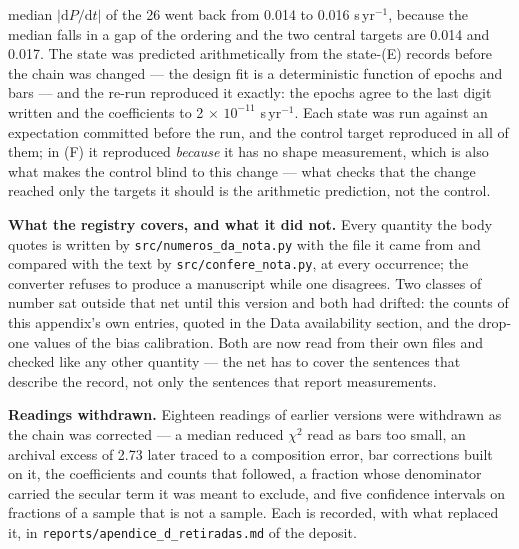 \documentclass{aa}
\begin{document}
median $|\mathrm{d}P/\mathrm{d}t|$ of the 26 went back from 0.014 to 0.016 s\,yr$^{-1}$, because the median falls in a gap of the ordering and the two central targets are 0.014 and 0.017. The state was predicted arithmetically from the state-(E) records before the chain was changed --- the design fit is a deterministic function of epochs and bars --- and the re-run reproduced it exactly: the epochs agree to the last digit written and the coefficients to 2 $\times$ $10^{-11}$ s\,yr$^{-1}$. Each state was run against an expectation committed before the run, and the control target reproduced in all of them; in (F) it reproduced \textit{because} it has no shape measurement, which is also what makes the control blind to this change --- what checks that the change reached only the targets it should is the arithmetic prediction, not the control.

\textbf{What the registry covers, and what it did not.} Every quantity the body quotes is written by \texttt{src/\allowbreak numeros\_\allowbreak da\_\allowbreak nota.py} with the file it came from and compared with the text by \texttt{src/\allowbreak confere\_\allowbreak nota.py}, at every occurrence; the converter refuses to produce a manuscript while one disagrees. Two classes of number sat outside that net until this version and both had drifted: the counts of this appendix's own entries, quoted in the Data availability section, and the drop-one values of the bias calibration. Both are now read from their own files and checked like any other quantity --- the net has to cover the sentences that describe the record, not only the sentences that report measurements.

\textbf{Readings withdrawn.} Eighteen readings of earlier versions were withdrawn as the chain was corrected --- a median reduced $\chi^2$ read as bars too small, an archival excess of 2.73 later traced to a composition error, bar corrections built on it, the coefficients and counts that followed, a fraction whose denominator carried the secular term it was meant to exclude, and five confidence intervals on fractions of a sample that is not a sample. Each is recorded, with what replaced it, in \texttt{reports/apendice\_\allowbreak d\_\allowbreak retiradas.md} of the deposit.
\end{document}
